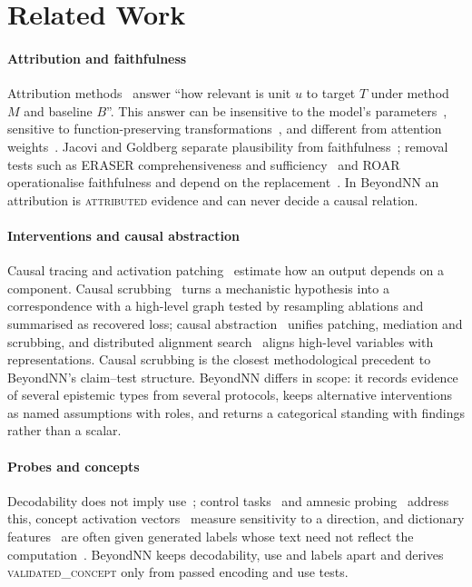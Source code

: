 \section{Related Work}
\label{sec:related}

\paragraph*{Attribution and faithfulness}
Attribution methods~\cite{simonyan2014saliency,sundararajan2017ig,lundberg2017shap} answer ``how relevant is unit $u$ to target $T$ under method $M$ and baseline $B$''. This answer can be insensitive to the model's parameters~\cite{adebayo2018sanity}, sensitive to function-preserving transformations~\cite{kindermans2019unreliability}, and different from attention weights~\cite{jain2019attention,wiegreffe2019notnot}. Jacovi and Goldberg separate plausibility from faithfulness~\cite{jacovi2020faithfulness}; removal tests such as ERASER comprehensiveness and sufficiency~\cite{deyoung2020eraser} and ROAR~\cite{hooker2019roar} operationalise faithfulness and depend on the replacement~\cite{hase2021ood}. In BeyondNN an attribution is \textsc{attributed} evidence and can never decide a causal relation.

\paragraph*{Interventions and causal abstraction}
Causal tracing and activation patching~\cite{meng2022rome,zhang2024patching} estimate how an output depends on a component. Causal scrubbing~\cite{chan2022scrubbing} turns a mechanistic hypothesis into a correspondence with a high-level graph tested by resampling ablations and summarised as recovered loss; causal abstraction~\cite{geiger2025abstraction} unifies patching, mediation and scrubbing, and distributed alignment search~\cite{geiger2024das} aligns high-level variables with representations. Causal scrubbing is the closest methodological precedent to BeyondNN's claim--test structure. BeyondNN differs in scope: it records evidence of several epistemic types from several protocols, keeps alternative interventions as named assumptions with roles, and returns a categorical standing with findings rather than a scalar.

\paragraph*{Probes and concepts}
Decodability does not imply use~\cite{belinkov2022probing}; control tasks~\cite{hewitt2019control} and amnesic probing~\cite{elazar2021amnesic} address this, concept activation vectors~\cite{kim2018tcav} measure sensitivity to a direction, and dictionary features~\cite{huben2024sae,bloom2024saelens} are often given generated labels whose text need not reflect the computation~\cite{turpin2023unfaithful}. BeyondNN keeps decodability, use and labels apart and derives \textsc{validated\_concept} only from passed encoding and use tests.

